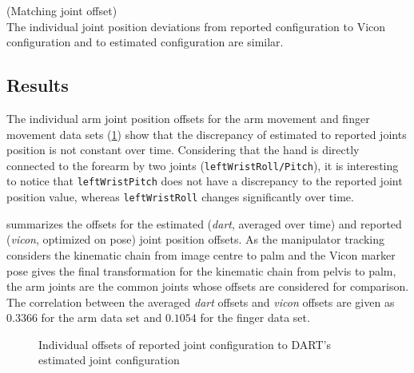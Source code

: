 \begin{hypothesis}(Matching joint offset)\\
The individual joint position deviations from reported configuration to Vicon configuration and to estimated configuration are similar.
\label{hyp:matching_joint_offset}
\end{hypothesis}

\subsection{Results}

The individual arm joint position offsets for the arm movement and finger movement data sets (\cref{fig:estimated_offsets}) show that the discrepancy of estimated to reported joints position is not constant over time. Considering that the hand is directly connected to the forearm by two joints (\texttt{leftWristRoll/Pitch}), it is interesting to notice that \texttt{leftWristPitch} does not have a discrepancy to the reported joint position value, whereas \texttt{leftWristRoll} changes significantly over time.

 summarizes the offsets for the estimated (\textit{dart}, averaged over time) and reported (\textit{vicon}, optimized on pose) joint position offsets. As the manipulator tracking considers the kinematic chain from image centre to palm and the Vicon marker pose gives the final transformation for the kinematic chain from pelvis to palm, the arm joints are the common joints whose offsets are considered for comparison.
The correlation between the averaged \textit{dart} offsets and \textit{vicon} offsets are given as $0.3366$ for the arm data set and $0.1054$ for the finger data set.

\begin{figure}[h]
\centering
{}

\caption[Estimated offsets]{Individual offsets of reported joint configuration to DART's estimated joint configuration}
\label{fig:estimated_offsets}
\end{figure}



